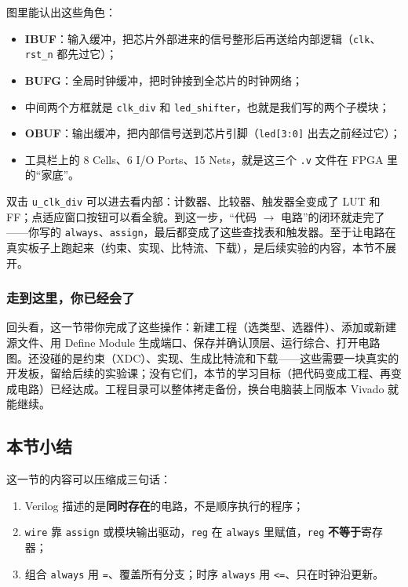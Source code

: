 图里能认出这些角色：

\begin{itemize}
  \item \textbf{IBUF}：输入缓冲，把芯片外部进来的信号整形后再送给内部逻辑（\texttt{clk}、\texttt{rst\_n} 都先过它）；
  \item \textbf{BUFG}：全局时钟缓冲，把时钟接到全芯片的时钟网络；
  \item 中间两个方框就是 \texttt{clk\_div} 和 \texttt{led\_shifter}，也就是我们写的两个子模块；
  \item \textbf{OBUF}：输出缓冲，把内部信号送到芯片引脚（\texttt{led[3:0]} 出去之前经过它）；
  \item 工具栏上的 8 Cells、6 I/O Ports、15 Nets，就是这三个 \texttt{.v} 文件在 FPGA 里的“家底”。
\end{itemize}

双击 \texttt{u\_clk\_div} 可以进去看内部：计数器、比较器、触发器全变成了 LUT 和 FF；点适应窗口按钮可以看全貌。到这一步，“代码 $\rightarrow$ 电路”的闭环就走完了——你写的 \texttt{always}、\texttt{assign}，最后都变成了这些查找表和触发器。至于让电路在真实板子上跑起来（约束、实现、比特流、下载），是后续实验的内容，本节不展开。

\subsubsection*{走到这里，你已经会了}

回头看，这一节带你完成了这些操作：新建工程（选类型、选器件）、添加或新建源文件、用 Define Module 生成端口、保存并确认顶层、运行综合、打开电路图。还没碰的是约束（XDC）、实现、生成比特流和下载——这些需要一块真实的开发板，留给后续的实验课；没有它们，本节的学习目标（把代码变成工程、再变成电路）已经达成。工程目录可以整体拷走备份，换台电脑装上同版本 Vivado 就能继续。

\subsection{本节小结}

这一节的内容可以压缩成三句话：

\begin{enumerate}
  \item Verilog 描述的是\textbf{同时存在}的电路，不是顺序执行的程序；
  \item \texttt{wire} 靠 \texttt{assign} 或模块输出驱动，\texttt{reg} 在 \texttt{always} 里赋值，\texttt{reg} \textbf{不等于}寄存器；
  \item 组合 \texttt{always} 用 \texttt{=}、覆盖所有分支；时序 \texttt{always} 用 \texttt{<=}、只在时钟沿更新。
\end{enumerate}
